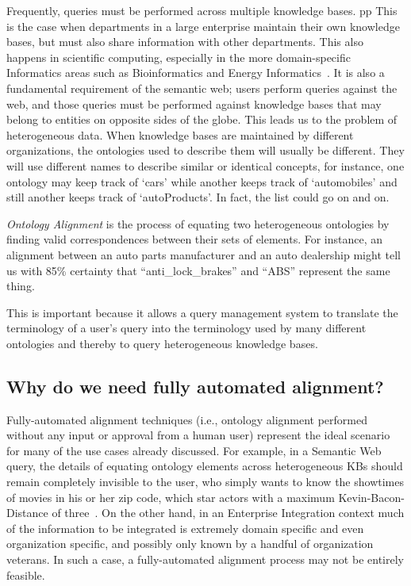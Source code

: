 \documentclass[letterpaper,twocolumn,12pt]{article}
\begin{document}
Frequently, queries must be performed across multiple knowledge bases. pp
This is the case when departments in a large enterprise maintain their own knowledge bases, but must also share information with other departments. 
This also happens in scientific computing, especially in the more domain-specific Informatics areas such as Bioinformatics and Energy Informatics~\cite{cotterell:2012:oei}.
It is also a fundamental requirement of the semantic web; users perform queries against the web, and those queries must be performed against knowledge bases that may belong to entities on opposite sides of the globe. 
This leads us to the problem of heterogeneous data. 
When knowledge bases are maintained by different organizations, the ontologies used to describe them will usually be different. 
They will use different names to describe similar or identical concepts, for instance, one ontology may keep track of `cars' while another keeps track of `automobiles' and still another keeps track of `autoProducts'. 
In fact, the list could go on and on.

\textit{Ontology Alignment} is the process of equating two heterogeneous ontologies by finding valid correspondences between their sets of elements. 
%
For instance, an alignment between an auto parts manufacturer and an auto dealership might tell us with 85\% certainty that ``anti\_lock\_brakes'' and ``ABS'' represent the same thing.

This is important because it allows a query management system to translate the terminology of a user's query into the terminology used by many different ontologies and thereby to query heterogeneous knowledge bases.

\subsection{Why do we need fully automated alignment?}
\label{subsec:automated}
Fully-automated alignment techniques (i.e., ontology alignment performed without any input or approval from a human user) represent the ideal scenario for many of the use cases already discussed. 
For example, in a Semantic Web query, the details of equating ontology elements across heterogeneous KBs should remain completely invisible to the user, who simply wants to know the showtimes of movies in his or her zip code, which star actors with a maximum Kevin-Bacon-Distance of three~\cite{hayes:2000:graph}.
On the other hand, in an Enterprise Integration context much of the information to be integrated is extremely domain specific and even organization specific, and possibly only known by a handful of organization veterans. 
In such a case, a fully-automated alignment process may not be entirely feasible.
\end{document}
